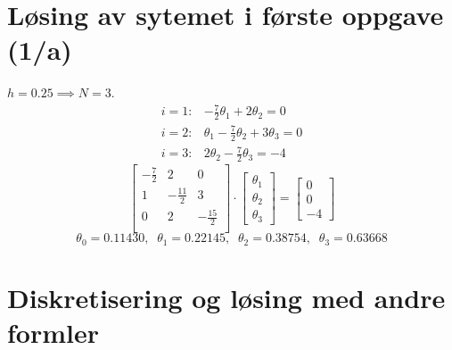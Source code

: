 \section{Løsing av sytemet i første oppgave (1/a)} %
\label{sec:l_sing_av_sytemet_i_f_rste_oppgave_}
$h=0.25 \implies N=3$.
\begin{align*}
  i = 1: & - \frac{7}{2} \theta_1 + 2 \theta_2 = 0 \\
  i = 2: & \theta_1 - \frac{7}{2} \theta_2 + 3\theta_3 = 0 \\
  i = 3: & 2\theta_2 - \frac{7}{2} \theta_3 = -4
\end{align*}
\begin{equation*}
  \begin{bmatrix}
    -\frac{7}{2} & 2             & 0 \\
    1            & -\frac{11}{2} & 3 \\
    0            & 2             & -\frac{15}{2} \\
  \end{bmatrix}
  \cdot
  \begin{bmatrix}
    \theta_1 \\ \theta_2 \\ \theta_3
  \end{bmatrix}
  =
  \begin{bmatrix}
    0 \\ 0 \\ -4
  \end{bmatrix}
\end{equation*}
\begin{equation*}
  \theta_0 = 0.11430, \;\; \theta_1 = 0.22145, \;\; \theta_2 = 0.38754, \;\; \theta_3 = 0.63668
\end{equation*}



\section{Diskretisering og løsing med andre formler} %
\label{sec:diskretisering_og_l_sing_med_andre_formler}

